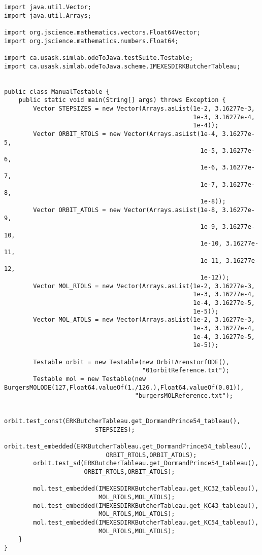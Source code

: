 \documentclass[10pt,letterpaper]{article}
\begin{document}
\begin{lstlisting}
import java.util.Vector;
import java.util.Arrays;

import org.jscience.mathematics.vectors.Float64Vector;
import org.jscience.mathematics.numbers.Float64;

import ca.usask.simlab.odeToJava.testSuite.Testable;
import ca.usask.simlab.odeToJava.scheme.IMEXESDIRKButcherTableau;


public class ManualTestable {
    public static void main(String[] args) throws Exception {
        Vector STEPSIZES = new Vector(Arrays.asList(1e-2, 3.16277e-3,
                                                    1e-3, 3.16277e-4,
                                                    1e-4));
        Vector ORBIT_RTOLS = new Vector(Arrays.asList(1e-4, 3.16277e-5,
                                                      1e-5, 3.16277e-6,
                                                      1e-6, 3.16277e-7,
                                                      1e-7, 3.16277e-8,
                                                      1e-8));
        Vector ORBIT_ATOLS = new Vector(Arrays.asList(1e-8, 3.16277e-9,
                                                      1e-9, 3.16277e-10,
                                                      1e-10, 3.16277e-11,
                                                      1e-11, 3.16277e-12,
                                                      1e-12));
        Vector MOL_RTOLS = new Vector(Arrays.asList(1e-2, 3.16277e-3,
                                                    1e-3, 3.16277e-4,
                                                    1e-4, 3.16277e-5,
                                                    1e-5));
        Vector MOL_ATOLS = new Vector(Arrays.asList(1e-2, 3.16277e-3,
                                                    1e-3, 3.16277e-4,
                                                    1e-4, 3.16277e-5,
                                                    1e-5));

        Testable orbit = new Testable(new OrbitArenstorfODE(),
                                      "01orbitReference.txt");
        Testable mol = new Testable(new BurgersMOLODE(127,Float64.valueOf(1./126.),Float64.valueOf(0.01)),
                                    "burgersMOLReference.txt");

        orbit.test_const(ERKButcherTableau.get_DormandPrince54_tableau(),
                         STEPSIZES);
        orbit.test_embedded(ERKButcherTableau.get_DormandPrince54_tableau(),
                            ORBIT_RTOLS,ORBIT_ATOLS);
        orbit.test_sd(ERKButcherTableau.get_DormandPrince54_tableau(),
                      ORBIT_RTOLS,ORBIT_ATOLS);

        mol.test_embedded(IMEXESDIRKButcherTableau.get_KC32_tableau(),
                          MOL_RTOLS,MOL_ATOLS);
        mol.test_embedded(IMEXESDIRKButcherTableau.get_KC43_tableau(),
                          MOL_RTOLS,MOL_ATOLS);
        mol.test_embedded(IMEXESDIRKButcherTableau.get_KC54_tableau(),
                          MOL_RTOLS,MOL_ATOLS);
    }
}
\end{lstlisting}
\end{document}
